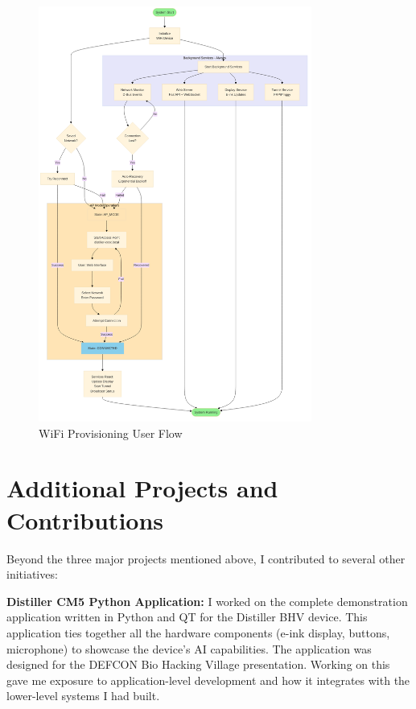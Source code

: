 \documentclass[12pt,a4paper]{report}
\begin{document}
\begin{figure}[h]
    \centering
    \includegraphics[width=0.8\textwidth]{wifi_provisioning_flow.png}
    \caption{WiFi Provisioning User Flow}
\end{figure}

\section{Additional Projects and Contributions}

Beyond the three major projects mentioned above, I contributed to several other initiatives:

\vspace{0.3cm}

\textbf{Distiller CM5 Python Application:} I worked on the complete demonstration application written in Python and QT for the Distiller BHV device. This application ties together all the hardware components (e-ink display, buttons, microphone) to showcase the device's AI capabilities. The application was designed for the DEFCON Bio Hacking Village presentation. Working on this gave me exposure to application-level development and how it integrates with the lower-level systems I had built.
\end{document}
